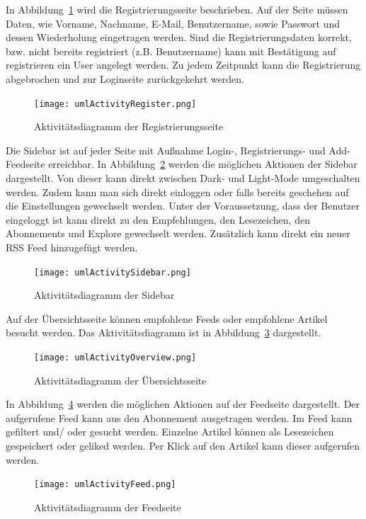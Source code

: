 In Abbildung~\ref{fig:umlActivityRegister.png} wird die Registrierungsseite beschrieben.
Auf der Seite müssen Daten, wie Vorname, Nachname, E-Mail, Benutzername, sowie Passwort und dessen Wiederholung eingetragen werden.
Sind die Registrierungsdaten korrekt, bzw. nicht bereits registriert (z.B. Benutzername) kann mit Bestätigung auf registrieren ein User angelegt werden.
Zu jedem Zeitpunkt kann die Registrierung abgebrochen und zur Loginseite zurückgekehrt werden.
\begin{figure}
    \texttt{[image: umlActivityRegister.png]}
    \caption{Aktivitätsdiagramm der Registrierungsseite}
    \label{fig:umlActivityRegister.png}
\end{figure}

Die Sidebar ist auf jeder Seite mit Außnahme Login-, Registrierungs- und Add-Feedseite erreichbar.
In Abbildung~\ref{fig:umlActivitySidebar.png} werden die möglichen Aktionen der Sidebar dargestellt.
Von dieser kann direkt zwischen Dark- und Light-Mode umgeschalten werden. Zudem kann man sich direkt einloggen
oder falls bereits geschehen auf die Einstellungen gewechselt werden. Unter der Voraussetzung, dass der Benutzer eingeloggt ist kann direkt zu den
Empfehlungen, den Lesezeichen, den Abonnements und Explore gewechselt werden. Zusätzlich kann direkt ein neuer RSS Feed hinzugefügt werden.
\begin{figure}
    \texttt{[image: umlActivitySidebar.png]}
    \caption{Aktivitätsdiagramm der Sidebar}
    \label{fig:umlActivitySidebar.png}
\end{figure}

Auf der Übersichtsseite können empfohlene Feeds oder empfohlene Artikel besucht werden.
Das Aktivitätsdiagramm ist in Abbildung~\ref{fig:umlActivityOverview.png} dargestellt.
\begin{figure}
    \texttt{[image: umlActivityOverview.png]}
    \caption{Aktivitätsdiagramm der Übersichtsseite}
    \label{fig:umlActivityOverview.png}
\end{figure}

In Abbildung~\ref{fig:umlActivityFeed.png} werden die möglichen Aktionen auf der Feedseite dargestellt.
Der aufgerufene Feed kann aus den Abonnement ausgetragen werden. Im Feed kann gefiltert und/ oder gesucht werden.
Einzelne Artikel können als Lesezeichen gespeichert oder geliked werden. Per Klick auf den Artikel kann dieser aufgerufen werden.
\begin{figure}
    \texttt{[image: umlActivityFeed.png]}
    \caption{Aktivitätsdiagramm der Feedseite}
    \label{fig:umlActivityFeed.png}
\end{figure}

